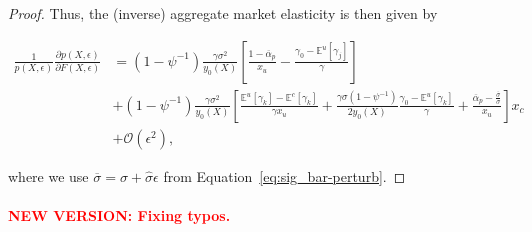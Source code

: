 \begin{proof}
	Thus, the (inverse) aggregate market elasticity is then given by
	\begin{small}
		\begin{align}
		\frac{1}{p(X, \epsilon)} \frac{\partial p(X, \epsilon)}{\partial F(X, \epsilon)}
		&=  \left(1-\psi^{-1}\right)\frac{\gamma \sigma^2}{y_0(X)} \left[ \frac{1-\overline{\alpha}_p}{x_u} - \frac{\gamma_0-\mathbb{E}^u\left[\gamma_j \right]}{\gamma}\right]\nonumber\\
		&+\left(1-\psi^{-1}\right)\frac{\gamma \sigma^2}{y_0(X)} \left[\frac{ \mathbb{E}^u[\gamma_k]- \mathbb{E}^c[\gamma_k] }{\gamma x_u}+\frac{\gamma\sigma \left(1-\psi^{-1}\right)}{2 y_{0}(X)}\frac{\gamma_0- \mathbb{E}^u[\gamma_k]}{\gamma} + \frac{\overline{\alpha}_p - \frac{\overline{\sigma}}{\sigma}}{x_u}   \right]x_c\nonumber\\
		&+ \mathcal{O}(\epsilon^2), 
		\end{align}
	\end{small}
where we use $ \overline{\sigma}=\sigma+\hat{\sigma}\epsilon $ from Equation~\eqref{eq:sig_bar-perturb}.
\end{proof}

\paragraph{\textcolor{red}{NEW VERSION: Fixing typos.}}



